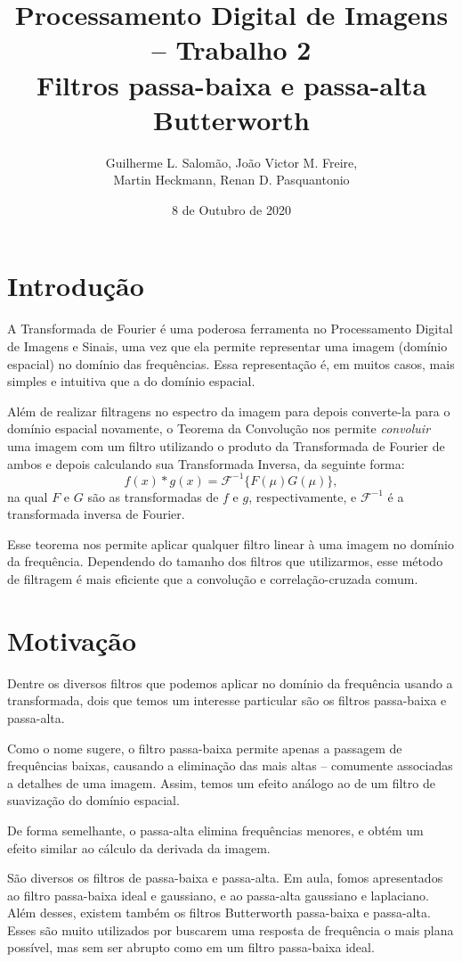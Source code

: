 \documentclass[12pt,a4paper]{article}
\title{Processamento Digital de Imagens – Trabalho 2\\Filtros passa-baixa e passa-alta Butterworth}
\author{Guilherme L. Salomão, João Victor M. Freire, \\Martin Heckmann, Renan D. Pasquantonio }
\date{8 de Outubro de 2020}
\begin{document}
\maketitle

\section{Introdução}
A Transformada de Fourier é uma poderosa ferramenta no Processamento Digital de Imagens e Sinais, uma vez que ela permite representar uma imagem (domínio espacial) no domínio das frequências. Essa representação é, em muitos casos, mais simples e intuitiva que a do domínio espacial.

Além de realizar filtragens no espectro da imagem para depois converte-la para o domínio espacial novamente, o Teorema da Convolução nos permite \textit{convoluir} uma imagem com um filtro utilizando o produto da Transformada de Fourier de ambos e depois calculando sua Transformada Inversa, da seguinte forma:
$$
 f(x) * g(x) = \mathscr{F}^{-1}\{F(\mu)G(\mu)\},
$$
na qual $F$ e $G$ são as transformadas de $f$ e $g$, respectivamente, e $\mathscr{F}^{-1}$ é a transformada inversa de Fourier.

Esse teorema nos permite aplicar qualquer filtro linear à uma imagem no domínio da frequência. Dependendo do tamanho dos filtros que utilizarmos, esse método de filtragem é mais eficiente que a convolução e correlação-cruzada comum.

\section{Motivação}
Dentre os diversos filtros que podemos aplicar no domínio da frequência usando a transformada, dois que temos um interesse particular são os filtros passa-baixa e passa-alta.

Como o nome sugere, o filtro passa-baixa permite apenas a passagem de frequências baixas, causando a eliminação das mais altas – comumente associadas a detalhes de uma imagem. Assim, temos um efeito análogo ao de um filtro de suavização do domínio espacial.

De forma semelhante, o passa-alta elimina frequências menores, e obtém um efeito similar ao cálculo da derivada da imagem.

São diversos os filtros de passa-baixa e passa-alta. Em aula, fomos apresentados ao filtro passa-baixa ideal e gaussiano, e ao passa-alta gaussiano e laplaciano. Além desses, existem também os filtros Butterworth passa-baixa e passa-alta. Esses são muito utilizados por buscarem uma resposta de frequência o mais plana possível, mas sem ser abrupto como em um filtro passa-baixa ideal.
\end{document}
